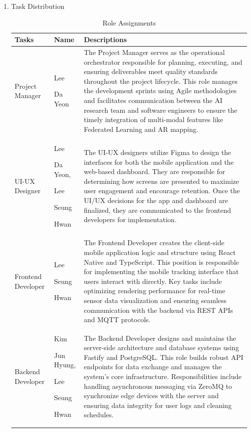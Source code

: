 \documentclass[conference]{IEEEtran}
\begin{document}
\clearpage
\begin{enumerate}

\item[5] Task Distribution

\begin{table}[H]
\caption{Role Assignments}
\def\arraystretch{1.24} \small

\begin{tabular}{|p{1.2cm}|p{1.2cm}|p{5.4cm}|}
    \hline
    Tasks & Name & Descriptions \\
    \hline
    Project Manager & Lee \par Da Yeon & The Project Manager serves as the operational orchestrator responsible for planning, executing, and ensuring deliverables meet quality standards throughout the project lifecycle. This role manages the development sprints using Agile methodologies and facilitates communication between the AI research team and software engineers to ensure the timely integration of multi-modal features like Federated Learning and AR mapping. \\ \hline
    
    UI-UX Designer &  Lee \par Da Yeon, \par Lee \par Seung \par Hwan  & The UI-UX designers utilize Figma to design the interfaces for both the mobile application and the web-based dashboard. They are responsible for determining how screens are presented to maximize user engagement and encourage retention. Once the UI/UX decisions for the app and dashboard are finalized, they are communicated to the frontend developers for implementation. \\ 
    \hline
    
    Frontend Developer & Lee \par Seung \par Hwan  & The Frontend Developer creates the client-side mobile application logic and structure using React Native and TypeScript. This position is responsible for implementing the mobile tracking interface that users interact with directly. Key tasks include optimizing rendering performance for real-time sensor data visualization and ensuring seamless communication with the backend via REST APIs and MQTT protocols. \\ 
    \hline

    Backend Developer &  Kim \par Jun Hyung, \par Lee \par Seung \par Hwan & The Backend Developer designs and maintains the server-side architecture and database systems using Fastify and PostgreSQL. This role builds robust API endpoints for data exchange and manages the system's core infrastructure. Responsibilities include handling asynchronous messaging via ZeroMQ to synchronize edge devices with the server and ensuring data integrity for user logs and cleaning schedules.\\ 
    \hline


\end{tabular}
\end{table}
\end{enumerate}
\end{document}
